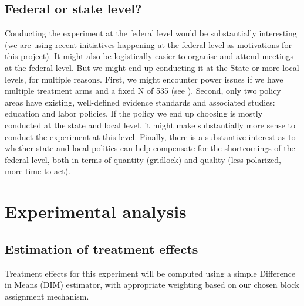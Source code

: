 \documentclass[12pt,final,fleqn]{article}
\theoremstyle{plain}
\begin{document}
\subsection{Federal or state level?} \label{sec: Level}

Conducting the experiment at the federal level would be substantially interesting (we are using recent initiatives happening at the federal level as motivations for this project). It might also be logistically easier to organise and attend meetings at the federal level. But we might end up conducting it at the State or more local levels, for multiple reasons. First, we might encounter power issues if we have multiple treatment arms and a fixed N of 535 (see ). Second, only two policy areas have existing, well-defined evidence standards and associated studies: education and labor policies. If the policy we end up choosing is mostly conducted at the state and local level, it might make substantially more sense to conduct the experiment at this level. Finally, there is a substantive interest as to whether state and local politics can help compensate for the shortcomings of the federal level, both in terms of quantity (gridlock) and quality (less polarized, more time to act). 

\section{Experimental analysis} \label{sec:analysis}

\subsection{Estimation of treatment effects} \label{sec:treatment_effects}
Treatment effects for this experiment will be computed using a simple Difference in Means (DIM) estimator, with appropriate weighting based on our chosen block assignment mechanism. 
\end{document}
